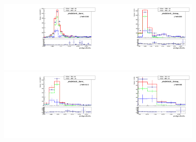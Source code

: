 \begin{figure}[htb]
  \begin{center}
   \includegraphics[width=0.45\textwidth]{../figs/figs_v11/ELECTRON_WGamma/TemplateFits/c_TEMPL_SIHIH_UNblind__phoEt35to45__Barrel__RooFit.pdf}\includegraphics[width=0.45\textwidth]{../figs/figs_v11/ELECTRON_WGamma/TemplateFits/c_TEMPL_SIHIH_UNblind__phoEt35to45__Endcap__RooFit.pdf}\\
   \includegraphics[width=0.45\textwidth]{../figs/figs_v11/ELECTRON_WGamma/TemplateFits/c_TEMPL_SIHIH_UNblind__phoEt45to55__Barrel__RooFit.pdf}\includegraphics[width=0.45\textwidth]{../figs/figs_v11/ELECTRON_WGamma/TemplateFits/c_TEMPL_SIHIH_UNblind__phoEt45to55__Endcap__RooFit.pdf}\\

\end{center}
\end{figure}
